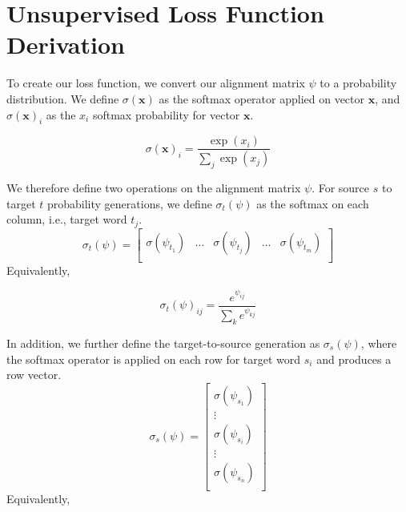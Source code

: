 \documentclass[twoside,twocolumn]{article}
\renewcommand{\vec}[1]{\mathbf{#1}}
\newlength\mystoreparindent
\newenvironment{myparindent}[1]{%
  \setlength{\mystoreparindent}{\the\parindent}
  \setlength{\parindent}{#1}
  }{%
  \setlength{\parindent}{\mystoreparindent}
}
\begin{document}

\clearpage
\appendix
\onecolumn
\begin{myparindent}{0pt}
\section{Unsupervised Loss Function Derivation}
\label{appendix:loss-function}
To create our loss function, we convert our alignment matrix $\psi$ to a
probability distribution. We define $\sigma(\vec{x})$ as the softmax operator
applied on vector $\vec{x}$, and $\sigma(\vec{x})_i$ as the $x_i$ softmax
probability for vector $\vec{x}$.

\begin{equation}
\sigma(\vec{x})_i = \frac{\exp(x_i)}{\sum_j\exp(x_j)}
\end{equation}

We therefore define two operations on the alignment matrix $\psi$. For source
$s$ to target $t$ probability generations, we define $\sigma_t(\psi)$ as the
softmax on each column, i.e., target word $t_j$.
\begin{equation}
  \sigma_t(\psi) = \left[
    \begin{matrix}
      \sigma(\psi_{t_1}) &
      \hdots &
      \sigma(\psi_{t_j}) &
      \hdots &
      \sigma(\psi_{t_m})  \\
    \end{matrix}
\right]
\end{equation}
Equivalently,

\begin{equation}
  \sigma_t(\psi)_{ij} = \frac{e^{\psi_{ij}}}{\sum_{k} e^{\psi_{kj}}}
\end{equation}

In addition, we further define the target-to-source generation as
$\sigma_s(\psi)$, where the softmax operator is applied on each row for target
word $s_i$ and produces a row vector.
\begin{equation}
  \sigma_s(\psi) = \left[
    \begin{matrix}
      \sigma(\psi_{s_1})  \\
      \vdots \\
      \sigma(\psi_{s_i})  \\
      \vdots \\
      \sigma(\psi_{s_n})  \\
    \end{matrix}
\right]
\end{equation}
Equivalently,


\end{myparindent}
\end{document}
